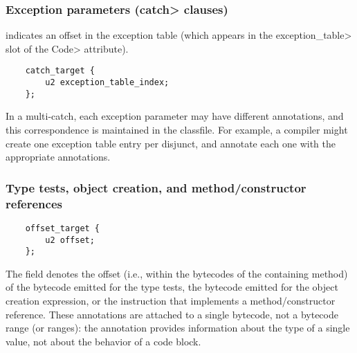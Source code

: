 \documentclass[10pt]{article}
\newcommand{\preverbnegspace}{\vspace{-5pt}}
\begin{document}


\subsubsection{Exception parameters (\<catch> clauses)\label{class-file:ext:ri:catch}}

 indicates an offset in the exception table (which
appears in the \<exception\_table> slot of the \<Code> attribute).

\preverbnegspace
\begin{Verbatim}
    catch_target {
        u2 exception_table_index;
    };
\end{Verbatim}

In a multi-catch, each exception parameter may have different annotations,
and this correspondence is maintained in the classfile.  For example, a
compiler might create one exception table entry per disjunct, and annotate
each one with the appropriate annotations.



\subsubsection{Type tests, object creation, and method/constructor references\label{class-file:ext:ri:instanceof}\label{class-file:ext:ri:new}\label{class-file:ext:ri:mref-receiver}\label{class-file:ext:ri:cref-receiver}}


\preverbnegspace
\begin{Verbatim}
    offset_target {
        u2 offset;
    };
\end{Verbatim}

The  field denotes the offset (i.e., within the bytecodes
of the containing method) of the  bytecode emitted for the type tests,
the  bytecode emitted for the object creation expression, or the
instruction that implements a method/constructor reference.
These annotations are attached to a single bytecode, not a bytecode range
(or ranges):  the annotation provides information about the type of a
single value, not about the behavior of a code block.
\end{document}
